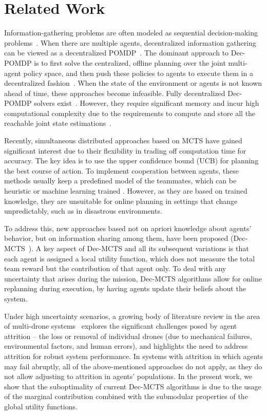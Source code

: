 \section{Related Work}

Information-gathering problems are often modeled as sequential decision-making problems~\citep{yao2020path}. When there are multiple agents, decentralized information gathering can be viewed as a decentralized POMDP~\citep{bernstein2002complexity}. The dominant approach to Dec-POMDP is to first solve the centralized, offline planning over the joint multi-agent policy space, and then push these policies to agents to execute them in a decentralized fashion~\citep{oliehoek2016concise}. When the state of the environment or agents is not known ahead of time, these approaches become infeasible. Fully decentralized Dec-POMDP solvers exist~\citep{spaan2006decentralized}. However, they require significant memory and incur high computational complexity due to the requirements to compute and store all the reachable joint state estimations~\citep{lauri2020multi}.

Recently, simultaneous distributed approaches based on MCTS have gained significant interest due to their flexibility in trading off computation time for accuracy. The key idea is to use the upper confidence bound (UCB) \citep{kocsis2006improved} for planning the best course of action. To implement cooperation between agents, these methods usually keep a predefined model of the teammates, which can be heuristic or machine learning trained \citep{claes2017decentralised,czechowski2020decentralized,choudhury2021scalable}. However, as they are based on trained knowledge, they are unsuitable for online planning in settings that change unpredictably, such as in disastrous environments.
 
To address this, new approaches based not on apriori knowledge about agents' behavior, but on information sharing among them, have been proposed (Dec-MCTS~\citep{best2019dec}). A key aspect of Dec-MCTS and all its subsequent variations \citep{li2019integrating,li2021dec,nguyen2022multi} is that each agent is assigned a local utility function, which does not measure the total team reward but the contribution of that agent only. To deal with any uncertainty that arises during the mission, Dec-MCTS algorithms allow for online replanning during execution, by having agents update their beliefs about the system. 

Under high uncertainty scenarios, a growing body of literature review in the area of multi-drone systems~\citep{williams2014multi, lizzio2022review, dinelli2023configurations, goeckner2023attrition} explores the significant challenges posed by agent attrition -- the loss or removal of individual drones (due to mechanical failures, environmental factors, and human errors), and highlights the need to address attrition for robust system performance. In systems with attrition in which agents may fail abruptly, all of the above-mentioned approaches do not apply, as they do not allow adjusting to attrition in agents' populations. In the present work, we show that the suboptimality of current Dec-MCTS algorithms is due to the usage of the marginal contribution combined with the submodular properties of the global utility functions.

